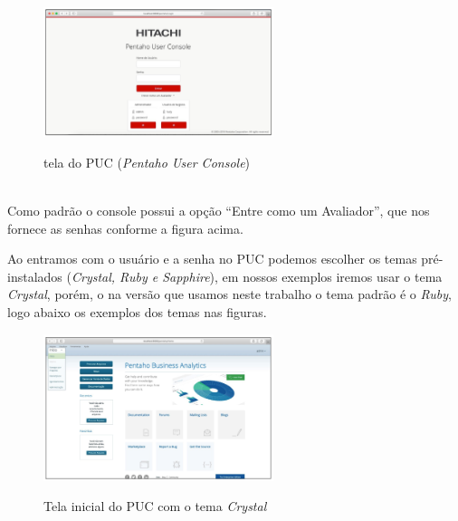 \begin{figure}[H]
	\vspace*{0,2cm}
    \centering
    \caption{tela do PUC (\textit{Pentaho User Console})}
    \includegraphics[width=0.6\textwidth]{./04-figuras/figura-puc}
    \label{fig:ilustfigpuc}
\end{figure}
\vspace*{-0,9cm}
{\raggedright {}} \\

Como padr\~{a}o o console possui a op\c{c}\~{a}o ``Entre como um Avaliador'', que nos fornece as senhas conforme a figura acima.

Ao entramos com o usu\'{a}rio e a senha no PUC podemos escolher os temas pr\'{e}-instalados 
(\textit{Crystal, Ruby e Sapphire}), em nossos exemplos iremos usar o tema \textit{Crystal}, por\'{e}m, o na vers\~{a}o que usamos 
neste trabalho o tema padr\~{a}o \'{e} o \textit{Ruby}, logo abaixo os exemplos dos temas nas figuras.

\begin{figure}[H]
	\vspace*{0,2cm}
    \centering
    \caption{Tela inicial do PUC com o tema \textit{Crystal}}
    \includegraphics[width=0.6\textwidth]{./04-figuras/figura-puc-tema-cristal}
    \label{fig:ilustfiguctemacristal}
\end{figure}
\vspace*{-0,9cm}
{\raggedright {}} \\

